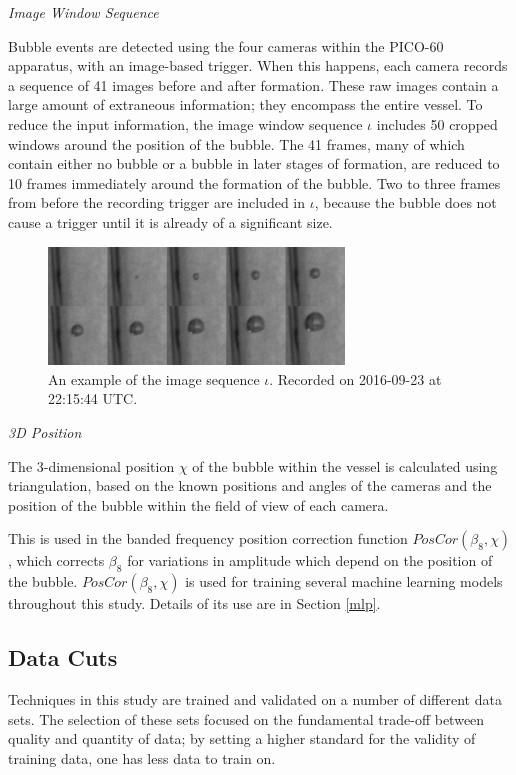 \documentclass[10pt]{article}
\begin{document}
\textit{Image Window Sequence}

Bubble events are detected using the four cameras within the PICO-60 apparatus, with an image-based trigger. When this happens, each camera records a sequence of 41 images before and after formation. These raw images contain a large amount of extraneous information; they encompass the entire vessel. To reduce the input information, the image window sequence $\iota$ includes 50 cropped windows around the position of the bubble. The 41 frames, many of which contain either no bubble or a bubble in later stages of formation, are reduced to 10 frames immediately around the formation of the bubble. Two to three frames from before the recording trigger are included in $\iota$, because the bubble does not cause a trigger until it is already of a significant size.

\begin{figure}[h]
    \centering
    \includegraphics[width=0.7\textwidth]{image_grid}
    \caption{\label{} An example of the image sequence $\iota$. Recorded on 2016-09-23 at 22:15:44 UTC.}
\end{figure}

\textit{3D Position}

The 3-dimensional position $\chi$ of the bubble within the vessel is calculated using triangulation, based on the known positions and angles of the cameras and the position of the bubble within the field of view of each camera.

This is used in the banded frequency position correction function $PosCor(\beta _{8}, \chi)$, which corrects $\beta _{8}$ for variations in amplitude which depend on the position of the bubble. $PosCor(\beta _{8}, \chi)$ is used for training several machine learning models throughout this study. Details of its use are in Section \ref{mlp}.

\subsection{Data Cuts}

Techniques in this study are trained and validated on a number of different data sets. The selection of these sets focused on the fundamental trade-off between quality and quantity of data; by setting a higher standard for the validity of training data, one has less data to train on.
\end{document}
